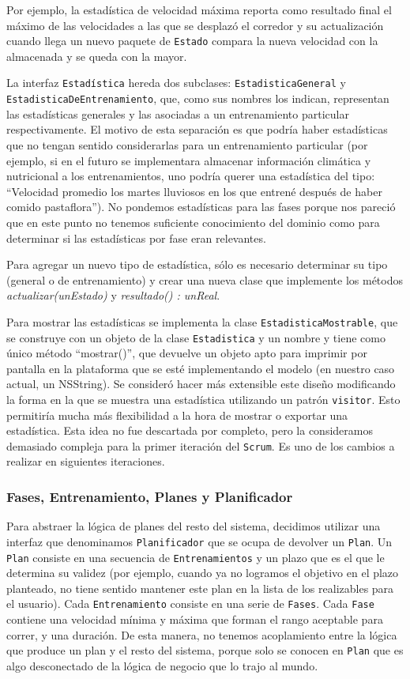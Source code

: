 \documentclass[10pt, a4paper,english,spanish]{article}
\renewcommand{\emph}[1]{\textit{#1}}
\begin{document}
Por ejemplo, la estadística de velocidad máxima reporta como resultado final el máximo de las velocidades a las que se desplazó el corredor y su actualización cuando llega un nuevo paquete de \texttt{Estado} compara la nueva velocidad con la almacenada y se queda con la mayor. 

La interfaz \texttt{Estadística} hereda dos subclases: \texttt{EstadisticaGeneral} y \texttt{EstadisticaDeEntrenamiento}, que, como sus nombres los indican, representan las estadísticas generales y las asociadas a un entrenamiento particular respectivamente. El motivo de esta separación es que podría haber estadísticas que no tengan sentido considerarlas para un entrenamiento particular (por ejemplo, si en el futuro se implementara almacenar información climática y nutricional a los entrenamientos, uno podría querer una estadística del tipo: ``Velocidad promedio los martes lluviosos en los que entrené después de haber comido pastaflora''). No pondemos estadísticas para las fases porque nos pareció que en este punto no tenemos suficiente conocimiento del dominio como para determinar si las estadísticas por fase eran relevantes.

Para agregar un nuevo tipo de estadística, sólo es necesario determinar su tipo (general o de entrenamiento) y crear una nueva clase que implemente los métodos \emph{actualizar(unEstado)} y \emph{resultado() : unReal}.

Para mostrar las estadísticas se implementa la clase \texttt{EstadisticaMostrable}, que se construye con un objeto de la clase \texttt{Estadistica} y un nombre y tiene como único método ``mostrar()'', que devuelve un objeto apto para imprimir por pantalla en la plataforma que se esté implementando el modelo (en nuestro caso actual, un NSString). Se consideró hacer más extensible este diseño modificando la forma en la que se muestra una estadística utilizando un patrón \texttt{visitor}. Esto permitiría mucha más flexibilidad a la hora de mostrar o exportar una estadística. Esta idea no fue descartada por completo, pero la consideramos demasiado compleja para la primer iteración del \texttt{Scrum}. Es uno de los cambios a realizar en siguientes iteraciones.

\subsubsection{Fases, Entrenamiento, Planes y Planificador}
Para abstraer la lógica de planes del resto del sistema, decidimos utilizar una interfaz que denominamos \texttt{Planificador} que se ocupa de devolver un \texttt{Plan}. Un \texttt{Plan} consiste en una secuencia de \texttt{Entrenamientos} y un plazo que es el que le determina su validez (por ejemplo, cuando ya no logramos el objetivo en el plazo planteado, no tiene sentido mantener este plan en la lista de los realizables para el usuario). Cada \texttt{Entrenamiento} consiste en una serie de \texttt{Fases}. Cada \texttt{Fase} contiene una velocidad mínima y máxima que forman el rango aceptable para correr, y una duración. De esta manera, no tenemos acoplamiento entre la lógica que produce un plan y el resto del sistema, porque solo se conocen en \texttt{Plan} que es algo desconectado de la lógica de negocio que lo trajo al mundo.
\end{document}

